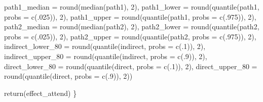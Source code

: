 \documentclass[
  letterpaper,
  DIV=11,
  numbers=noendperiod]{scrreprt}
\newenvironment{Shaded}{}{}
\newcommand{\AttributeTok}[1]{\textcolor[rgb]{0.84,0.23,0.29}{#1}}
\newcommand{\DecValTok}[1]{\textcolor[rgb]{0.00,0.36,0.77}{#1}}
\newcommand{\FunctionTok}[1]{\textcolor[rgb]{0.44,0.26,0.76}{#1}}
\newcommand{\NormalTok}[1]{\textcolor[rgb]{0.14,0.16,0.18}{#1}}
\begin{document}
\begin{Shaded}
\begin{Highlighting}[]
                              \AttributeTok{path1\_median =} \FunctionTok{round}\NormalTok{(}\FunctionTok{median}\NormalTok{(path1), }\DecValTok{2}\NormalTok{),}
                              \AttributeTok{path1\_lower =} \FunctionTok{round}\NormalTok{(}\FunctionTok{quantile}\NormalTok{(path1, }\AttributeTok{probs =} \FunctionTok{c}\NormalTok{(.}\DecValTok{025}\NormalTok{)), }\DecValTok{2}\NormalTok{),}
                              \AttributeTok{path1\_upper =} \FunctionTok{round}\NormalTok{(}\FunctionTok{quantile}\NormalTok{(path1, }\AttributeTok{probs =} \FunctionTok{c}\NormalTok{(.}\DecValTok{975}\NormalTok{)), }\DecValTok{2}\NormalTok{),}
                              \AttributeTok{path2\_median =} \FunctionTok{round}\NormalTok{(}\FunctionTok{median}\NormalTok{(path2), }\DecValTok{2}\NormalTok{),}
                              \AttributeTok{path2\_lower =} \FunctionTok{round}\NormalTok{(}\FunctionTok{quantile}\NormalTok{(path2, }\AttributeTok{probs =} \FunctionTok{c}\NormalTok{(.}\DecValTok{025}\NormalTok{)), }\DecValTok{2}\NormalTok{),}
                              \AttributeTok{path2\_upper =} \FunctionTok{round}\NormalTok{(}\FunctionTok{quantile}\NormalTok{(path2, }\AttributeTok{probs =} \FunctionTok{c}\NormalTok{(.}\DecValTok{975}\NormalTok{)), }\DecValTok{2}\NormalTok{),}
                              \AttributeTok{indirect\_lower\_80 =} \FunctionTok{round}\NormalTok{(}\FunctionTok{quantile}\NormalTok{(indirect, }\AttributeTok{probs =} \FunctionTok{c}\NormalTok{(.}\DecValTok{1}\NormalTok{)), }\DecValTok{2}\NormalTok{),}
                              \AttributeTok{indirect\_upper\_80 =} \FunctionTok{round}\NormalTok{(}\FunctionTok{quantile}\NormalTok{(indirect, }\AttributeTok{probs =} \FunctionTok{c}\NormalTok{(.}\DecValTok{9}\NormalTok{)), }\DecValTok{2}\NormalTok{),}
                              \AttributeTok{direct\_lower\_80 =} \FunctionTok{round}\NormalTok{(}\FunctionTok{quantile}\NormalTok{(direct, }\AttributeTok{probs =} \FunctionTok{c}\NormalTok{(.}\DecValTok{1}\NormalTok{)), }\DecValTok{2}\NormalTok{),}
                              \AttributeTok{direct\_upper\_80 =} \FunctionTok{round}\NormalTok{(}\FunctionTok{quantile}\NormalTok{(direct, }\AttributeTok{probs =} \FunctionTok{c}\NormalTok{(.}\DecValTok{9}\NormalTok{)), }\DecValTok{2}\NormalTok{))}
  
  \FunctionTok{return}\NormalTok{(effect\_attend)}
\NormalTok{\}}


\end{Highlighting}
\end{Shaded}
\end{document}
